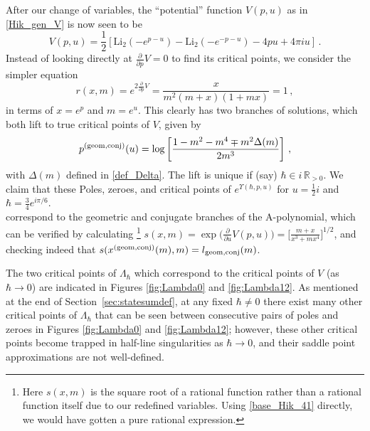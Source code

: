 \documentclass[hyper]{JHEP3}
\newcommand{\R}{{\mathbb{R}}}
\newcommand\be{\begin{equation}}
\newcommand\ee{\end{equation}}
\def\Li{\text{Li}_2}
\begin{document}
After our change of variables, the ``potential'' function $V(p,u)$ as in \eqref{Hik_gen_V} is now seen to be
\be
V(p,u) = \frac{1}{2}\left[\Li(-e^{p-u})-\Li(-e^{-p-u})-4p u + 4\pi i u\right]\,.
\label{Hik41V}
\ee
%
Instead of looking directly at $\frac{\partial}{\partial p} V=0$
to find its critical points, we consider the simpler equation
\be
r(x,m) = e^{2\frac{\partial}{\partial p}V} = \frac{x}{m^2(m+x)(1+mx)} = 1\,,
\ee
in terms of $x=e^p$ and $m=e^u$.
This clearly has two branches of solutions,
which both lift to true critical points of $V$, given by
\be
p^{({\rm geom},{\rm conj})}(u) = \log\left[\frac{1-m^2-m^4\mp m^2\Delta(m)}{2m^3}\right]\,,
\label{HikpGC}
\ee
with $\Delta(m)$ defined in \eqref{def_Delta}. The lift is unique if (say) $\hbar \in i\,\R_{>0}$.
We claim that these %
%
%
{Poles, zeroes, and critical points of $e^{\Upsilon(\hbar,p,u)}$ for $u=\frac{1}{2}i$ and $\hbar = \frac{3}{4}e^{i\pi/6}$.\\
\label{fig:MinefieldY} } %
%
\noindent correspond to the geometric and conjugate branches of the A-polynomial,
which can be verified by calculating%
%
\footnote{Here $s(x,m)$ is the square root of a rational function rather than
a rational function itself due to our redefined variables.
Using \eqref{base_Hik_41} directly, we would have gotten a pure rational expression.} %
%
$s(x,m) = \exp\big( \frac{\partial}{\partial u} V(p,u) \big) = \big[\frac{m+x}{x^3+mx^4}\big]^{1/2}$,
and checking indeed that $s(x^{({\rm geom}, {\rm conj})}(m),m) = l_{{\rm geom}, {\rm conj}}(m)$.



The two critical points of $\Lambda_{\hbar}$ which correspond to the critical points of $V$
(as $\hbar \to 0$) are indicated in Figures \ref{fig:Lambda0} and \ref{fig:Lambda12}.
As mentioned at the end of Section~\ref{sec:statesumdef}, at any fixed $\hbar \neq 0$
there exist many other critical points of $\Lambda_{\hbar}$ that can be seen between consecutive pairs of poles and zeroes
in Figures \ref{fig:Lambda0} and \ref{fig:Lambda12};
however, these other critical points become trapped in half-line singularities as $\hbar\rightarrow0$,
and their saddle point approximations are not well-defined.
\end{document}
